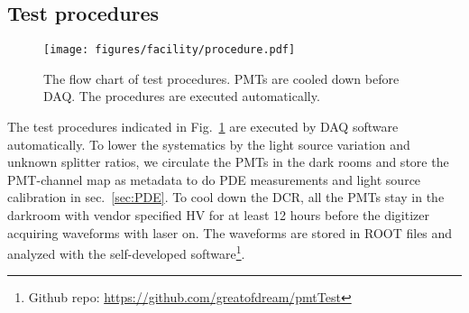 \subsection{Test procedures}
\begin{figure}
    \centering
    \texttt{[image: figures/facility/procedure.pdf]}
    \caption{The flow chart of test procedures. PMTs are cooled down before DAQ. The procedures are executed automatically.}
    \label{fig:testingprocedure}
\end{figure}

The test procedures indicated in Fig.~\ref{fig:testingprocedure} are executed by DAQ software automatically. To lower the systematics by the light source variation and unknown splitter ratios, we circulate the PMTs in the dark rooms and store the PMT-channel map as metadata to do PDE measurements and light source calibration in sec.~\ref{sec:PDE}. To cool down the DCR, all the PMTs stay in the darkroom with vendor specified HV for at least 12 hours before the digitizer acquiring waveforms with laser on. The waveforms are stored in ROOT files and analyzed with the self-developed software\footnote{Github repo: \url{https://github.com/greatofdream/pmtTest}}.
